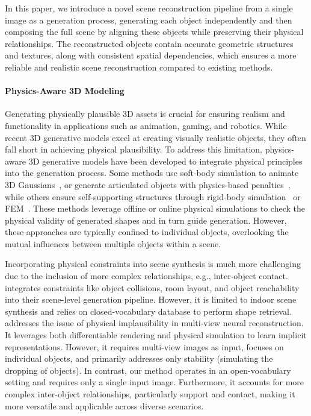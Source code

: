 In this paper, we introduce a novel scene reconstruction pipeline from a single image as a generation process, generating each object independently and then composing the full scene by aligning these objects while preserving their physical relationships. The reconstructed objects contain accurate geometric structures and textures, along with consistent spatial dependencies, which ensures a more reliable and realistic scene reconstruction compared to existing methods.

\paragraph{Physics-Aware 3D Modeling}
Generating physically plausible 3D assets is crucial for ensuring realism and functionality in applications such as animation, gaming, and robotics.
While recent 3D generative models excel at creating visually realistic objects, they often fall short in achieving physical plausibility. To address this limitation, physics-aware 3D generative models have been developed to integrate physical principles into the generation process. Some methods use soft-body simulation to animate 3D Gaussians~\cite{xie2024physgaussian,zhong2025reconstruction}, or generate articulated objects with physics-based penalties~\cite{liu2023few}, while others ensure self-supporting structures through rigid-body simulation~\cite{mezghanni2021physically,mezghanni2022physical,chen2024atlas3d} or FEM~\cite{guo2024physically,xu2024precise}. These methods leverage offline or online physical simulations to check the physical validity of generated shapes and in turn guide generation.
However, these approaches are typically confined to individual objects, overlooking the mutual influences between multiple objects within a scene. 

Incorporating physical constraints into scene synthesis is much more challenging due to the inclusion of more complex relationships, e.g., inter-object contact. \citet{yang2024physcene} integrates constraints like object collisions, room layout, and object reachability into their scene-level generation pipeline. However, it is limited to indoor scene synthesis and relies on closed-vocabulary database to perform shape retrieval.
\citet{ni2024phyrecon} addresses the issue of physical implausibility in multi-view neural reconstruction. It leverages both differentiable rendering and physical simulation to learn implicit representations. However, it requires multi-view images as input, focuses on individual objects, and primarily addresses only stability (simulating the dropping of objects).
In contrast, our method operates in an open-vocabulary setting and requires only a single input image. Furthermore, it accounts for more complex inter-object relationships, particularly support and contact, making it more versatile and applicable across diverse scenarios.

